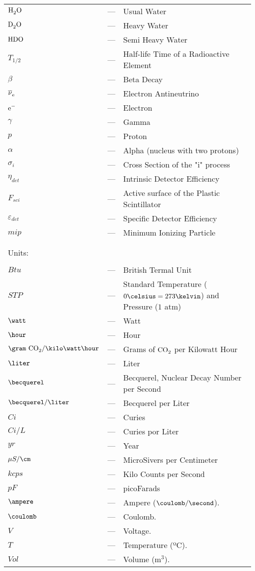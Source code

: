 \begin{longtable}{p{25mm} c p{120mm} }
$\ce{H_{2}O}$ & --- & Usual Water\\
$\ce{D_{2}O}$ & --- & Heavy Water\\
$\ce{HDO}$ & --- & Semi Heavy Water\\
$T_{1/2}$ & --- & Half-life Time of a Radioactive Element\\
$\beta$ & --- & Beta Decay\\
$\ce{\overline{\nu}_e}$ & --- & Electron Antineutrino\\
$\ce{e^-}$ & --- & Electron\\
$\gamma$ & --- & Gamma\\
$p$ & --- & Proton\\
$\alpha$ & --- & Alpha (nucleus with two protons)\\
$\sigma_i$ & --- & Cross Section of the "i" process\\
$\eta_{det}$ & --- & Intrinsic Detector Efficiency\\
$F_{sci}$ & --- & Active surface of the Plastic Scintillator\\
$\varepsilon_{det}$ & --- & Specific Detector Efficiency\\
$mip$ & --- & Minimum Ionizing Particle\\

\\
\\

\multicolumn{3}{l}{Units:}\\
\\
$Btu$ & --- & British Termal Unit\\
$STP$ & --- & Standard Temperature ($0\celsius=273\kelvin$) and Pressure ($1$ atm)\\
$\watt$ & --- & Watt\\
$\hour$ & --- & Hour\\
$\gram~\ce{CO_2} /\kilo\watt\hour$ & --- & Grams of $\ce{CO_2}$ per Kilowatt Hour\\
$\liter$ & --- & Liter\\
$\becquerel$ & --- & Becquerel, Nuclear Decay Number per Second\\
$\becquerel/\liter$ & --- & Becquerel per Liter\\
$Ci$ & --- & Curies\\
$Ci/L$ & --- & Curies por Liter\\
$yr$ & --- & Year\\
$\mu S/\cm$ & --- & MicroSivers per Centimeter\\
$kcps$ & --- & Kilo Counts per Second\\
$pF$ & --- & picoFarads\\
$\ampere$ & --- & Ampere ($\coulomb/\second$).\\
$\coulomb$ & --- & Coulomb.\\
$V$ & --- & Voltage.\\
$T$ & --- & Temperature (ºC).\\
$Vol$ & --- & Volume (m$^3$).\\



\end{longtable}
